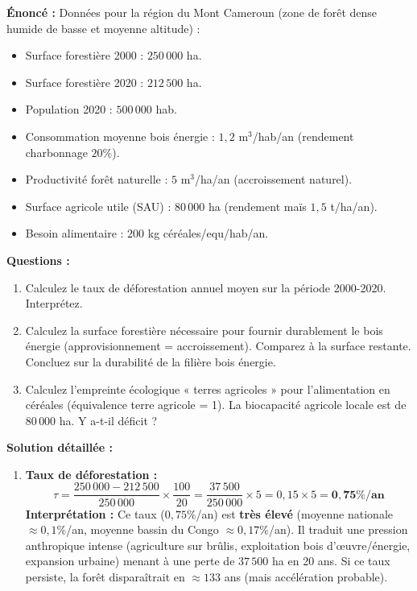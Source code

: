 \documentclass[11pt]{article}
\begin{document}
\begin{exoresolu}
    \textbf{Énoncé :} Données pour la région du Mont Cameroun (zone de forêt dense humide de basse et moyenne altitude) :
    \begin{itemize}
        \item Surface forestière 2000 : $250\,000$ ha.
        \item Surface forestière 2020 : $212\,500$ ha.
        \item Population 2020 : $500\,000$ hab.
        \item Consommation moyenne bois énergie : $1,2$ m$^3$/hab/an (rendement charbonnage $20\%$).
        \item Productivité forêt naturelle : $5$ m$^3$/ha/an (accroissement naturel).
        \item Surface agricole utile (SAU) : $80\,000$ ha (rendement maïs $1,5$ t/ha/an).
        \item Besoin alimentaire : $200$ kg céréales/equ/hab/an.
    \end{itemize}
    \textbf{Questions :}
    \begin{enumerate}
        \item Calculez le taux de déforestation annuel moyen sur la période 2000-2020. Interprétez.
        \item Calculez la surface forestière nécessaire pour fournir durablement le bois énergie (approvisionnement = accroissement). Comparez à la surface restante. Concluez sur la durabilité de la filière bois énergie.
        \item Calculez l'empreinte écologique « terres agricoles » pour l'alimentation en céréales (équivalence terre agricole = 1). La biocapacité agricole locale est de $80\,000$ ha. Y a-t-il déficit ?
    \end{enumerate}
    \tcblower
    \textbf{Solution détaillée :}
    \begin{enumerate}
        \item \textbf{Taux de déforestation :}
        \[ \tau = \frac{250\,000 - 212\,500}{250\,000} \times \frac{100}{20} = \frac{37\,500}{250\,000} \times 5 = 0,15 \times 5 = \mathbf{0,75\% / an} \]
        \textbf{Interprétation :} Ce taux ($0,75\%$/an) est \textbf{très élevé} (moyenne nationale $\approx 0,1\%$/an, moyenne bassin du Congo $\approx 0,17\%$/an). Il traduit une pression anthropique intense (agriculture sur brûlis, exploitation bois d'œuvre/énergie, expansion urbaine) menant à une perte de $37\,500$ ha en 20 ans. Si ce taux persiste, la forêt disparaîtrait en $\approx 133$ ans (mais accélération probable).

\end{enumerate}
\end{exoresolu}
\end{document}
